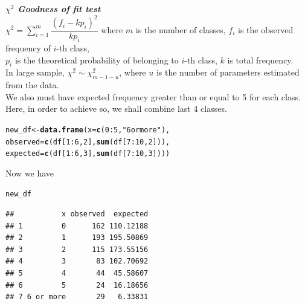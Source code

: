 \documentclass[11pt, a4paper]{article}\usepackage[]{graphicx}\usepackage[]{xcolor}
\makeatletter
\newcommand{\hlnum}[1]{\textcolor[rgb]{0.686,0.059,0.569}{#1}}%
\newcommand{\hlsng}[1]{\textcolor[rgb]{0.192,0.494,0.8}{#1}}%
\newcommand{\hlopt}[1]{\textcolor[rgb]{0,0,0}{#1}}%
\newcommand{\hldef}[1]{\textcolor[rgb]{0.345,0.345,0.345}{#1}}%
\newcommand{\hlkwb}[1]{\textcolor[rgb]{0.69,0.353,0.396}{#1}}%
\newcommand{\hlkwc}[1]{\textcolor[rgb]{0.333,0.667,0.333}{#1}}%
\newcommand{\hlkwd}[1]{\textcolor[rgb]{0.737,0.353,0.396}{\textbf{#1}}}%
\newenvironment{kframe}{%
 \def\at@end@of@kframe{}%
 \ifinner\ifhmode%
  \def\at@end@of@kframe{\end{minipage}}%
  \begin{minipage}{\columnwidth}%
 \fi\fi%
 \def\FrameCommand##1{\hskip\@totalleftmargin \hskip-\fboxsep
 \colorbox{shadecolor}{##1}\hskip-\fboxsep
     \hskip-\linewidth \hskip-\@totalleftmargin \hskip\columnwidth}%
 \MakeFramed {\advance\hsize-\width
   \@totalleftmargin\z@ \linewidth\hsize
   \@setminipage}}%
 {\par\unskip\endMakeFramed%
 \at@end@of@kframe}
\newenvironment{knitrout}{}{} %
\makeatother
\begin{document}
\newpage

\faArrowAltCircleRight[regular] \textit{\textbf{$\chi^2$ Goodness of fit test}} \\

$\chi^2 = \sum \limits_{i = 1}^{m} \dfrac{(f_i - kp_i)^2}{kp_i}$ where $m$ is the number of classes, $f_i$ is the observed frequency of $i$-th class, \\

$p_i$ is the theoretical probability of belonging to $i$-th class, $k$ is total frequency. \\

In large sample, $\chi^2 \sim \chi^2_{m-1-u}$, where $u$ is the number of parameters estimated from the data. \\

We also must have expected frequency greater than or equal to 5 for each class. \\

Here, in order to achieve so, we shall combine last 4 classes.

\begin{knitrout}
\color{fgcolor}\begin{kframe}
\begin{alltt}
\hldef{new_df} \hlkwb{<-} \hlkwd{data.frame}\hldef{(}\hlkwc{x} \hldef{=} \hlkwd{c}\hldef{(}\hlnum{0}\hlopt{:}\hlnum{5}\hldef{,} \hlsng{"6 or more"}\hldef{),}
                     \hlkwc{observed} \hldef{=} \hlkwd{c}\hldef{(df[}\hlnum{1}\hlopt{:}\hlnum{6}\hldef{,} \hlnum{2}\hldef{],} \hlkwd{sum}\hldef{(df[}\hlnum{7}\hlopt{:}\hlnum{10}\hldef{,} \hlnum{2}\hldef{])),}
                     \hlkwc{expected} \hldef{=} \hlkwd{c}\hldef{(df[}\hlnum{1}\hlopt{:}\hlnum{6}\hldef{,} \hlnum{3}\hldef{],} \hlkwd{sum}\hldef{(df[}\hlnum{7}\hlopt{:}\hlnum{10}\hldef{,} \hlnum{3}\hldef{])))}
\end{alltt}
\end{kframe}
\end{knitrout}

Now we have

\begin{knitrout}
\color{fgcolor}\begin{kframe}
\begin{alltt}
\hldef{new_df}
\end{alltt}
\begin{verbatim}
##           x observed  expected
## 1         0      162 110.12188
## 2         1      193 195.50869
## 3         2      115 173.55156
## 4         3       83 102.70692
## 5         4       44  45.58607
## 6         5       24  16.18656
## 7 6 or more       29   6.33831
\end{verbatim}
\end{kframe}
\end{knitrout}
\end{document}
